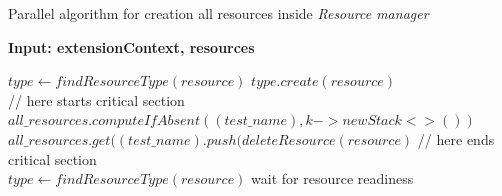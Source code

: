 \begin{algorithm}[H]
\label{01:alg:dsdsd}
\caption{Parallel algorithm for creation all resources inside \emph{Resource manager}}

\hspace*{\algorithmicindent} \textbf{Input: extensionContext, resources}

    \begin{algorithmic}[1]
            \State $type \gets findResourceType(resource)$
            \State $type.create(resource)$
            \\
            \State // here starts critical section
            \State $all\_resources.computeIfAbsent((test\_name), k -> new Stack<>())$
            \State $all\_resources.get((test\_name).push(deleteResource(resource)$
            \State // here ends critical section
            \\
                \State $type \gets findResourceType(resource)$
                \State wait for resource readiness
            \EndForEach
        \EndIf
        \EndForEach
    \end{algorithmic}
\end{algorithm}
